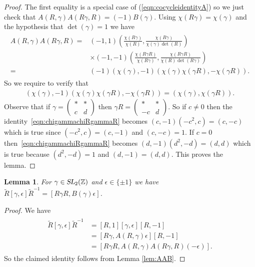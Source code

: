 \documentclass[aps,prd,groupedaddress,preprint,tightenlines,eqsecnum,nofootinbib]{revtex4}
\newcommand{\g}{\gamma}
\newcommand{\e}{\epsilon}
\newcommand{\SL}{\operatorname{\textsl{SL}}}      %
\newcommand{\Z}{{\mathbb Z}}%
\newcommand{\WT}{\widetilde}
\newtheorem{lem}[thm]{Lemma}
\begin{document}
\begin{proof}
The first equality is a special case of (\ref{eqn:cocycleidentityA}) so we just check that $A(R,\g)A(R\g,R)=(-1)B(\g)$.
Using $\chi(R\gamma)=\chi(\gamma)$ and the hypothesis that $\det(\g)=1$ we have 
\begin{gather}
\begin{split}
A(R,\g)A(R\g,R)=&
(-1,1)\left(\frac{\chi(R\g)}{\chi(R)},\frac{\chi(R\gamma)}{\chi(\g)\det (R)}\right)\\
& \times
(-1,-1)\left(\frac{\chi(R\g R)}{\chi(R\g)},\frac{\chi(R\g R)}{\chi(R)\det (R\g)} \right)\\
=&
(-1)\left({\chi(\g)},-1\right)
\left({\chi(\g)}{\chi(\g R)},-{\chi(\g R)} \right).
\end{split}
\end{gather}
So we require to verify that 
\begin{align}
\label{eqn:chigammachiRgammaR}
(\chi(\g),-1)({\chi(\g)} {\chi(\g R)},-\chi(\g R))
=
(\chi(\g),\chi(\g R)).
\end{align}
Observe that if $\g=\left(\begin{smallmatrix}*&*\\c&d\end{smallmatrix}\right)$ then $\g R=\left(\begin{smallmatrix}*&*\\-c&d\end{smallmatrix}\right)$. So if $c\neq 0$ then the identity~\eqref{eqn:chigammachiRgammaR} becomes $(c,-1)(-c^2,c)=(c,-c)$ which is true since $(-c^2,c)=(c,-1)$ and $(c,-c)=1$. If $c=0$ then~\eqref{eqn:chigammachiRgammaR} becomes $(d,-1)(d^2,-d)=(d,d)$ which is true because $(d^2,-d)=1$ and $(d,-1)=(d,d)$. This proves the lemma.
\end{proof}

\begin{lem}
\label{lem:RgammaR}
For $\g\in {\SL_2}(\Z)$ and $\e\in\{\pm1\}$ we have $\WT R[\g,\e]\WT R^{-1} = [R\g R, B(\g)\e]$.
\end{lem}

\begin{proof}
We have
\begin{gather}
\begin{split}
\WT R[\g,\e]\WT R^{-1}&=[R,1][\g,\e][R,-1]\\
&=[R\g,A(R,\g)\e][R,-1]\\
&=[R\g R,A(R,\g)A(R\g,R)(-\e)].
\end{split}
\end{gather}
So the claimed identity follows from Lemma \ref{lem:AAB}.
\end{proof}
\end{document}
